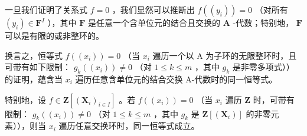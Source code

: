 一旦我们证明了关系式 \(f = 0\) ，我们显然可以推断出 \(f((y_i)) = 0\) （对所有 \((y_i) \in \mathbf{F}^{I}\) ），其中 \(\mathbf{F}\) 是任意一个含单位元的结合且交换的 \(\mathbf{A}\) -代数；特别地， \(\mathbf{F}\) 可以是有限的或非整环的。

换言之，恒等式 \(f((x_{i})) = 0\) （当 \(x_{i}\) 遍历一个以 A 为子环的无限整环时，且可带有如下限制： \(g_{k}((x_{i})) \neq 0\) （对 \(1 \leqslant k \leqslant m\) ，其中 \(g_{k}\) 是非零多项式））的证明，蕴含当 \(x_{i}\) 遍历任意含单位元的结合交换 A-代数时的同一恒等式。

特别地，设 \(f \in \mathbf{Z}[(\mathbf{X}_i)_{i \in I}]\) 。若 \(f((x_i)) = 0\) （当 \(x_i\) 遍历 \(\mathbf{Z}\) 时，可带有限制： \(g_k((x_i)) \neq 0\) （对 \(1 \leqslant k \leqslant m\) ，其中 \(g_k\) 是 \(\mathbf{Z}[(\mathbf{X}_i)]\) 的非零元素）），则当 \(x_i\) 遍历任意交换环时，同一恒等式成立。

